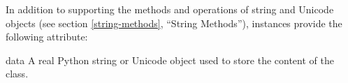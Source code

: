 In addition to supporting the methods and operations of string and
Unicode objects (see section \ref{string-methods}, ``String
Methods''),  instances provide the following
attribute:

\begin{memberdesc}{data}
A real Python string or Unicode object used to store the content of the
 class.
\end{memberdesc}
